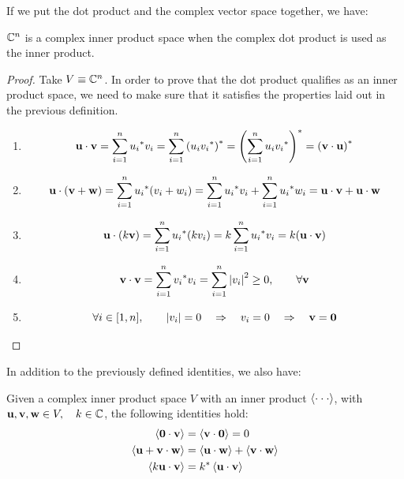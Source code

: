 \documentclass[12pt]{article}
\begin{document}
If we put the dot product and the complex vector space together, we have:

\begin{theorem}
    $\mathbb{C}^n$ is a complex inner product space when the complex dot product is used as the inner product.
\end{theorem}

\begin{proof}
    Take $V \equiv \mathbb{C}^n$. In order to prove that the dot product qualifies as an inner product space, we need to make sure that it satisfies the properties laid out in the previous definition. 
    \begin{enumerate}
        \item $$\mathbf{u} \cdot \mathbf{v} = \sum_{i=1}^{n} {u_i}^* v_i = \sum_{i=1}^{n} {(u_i {v_i}^*)}^* = {\left(\sum_{i=1}^{n} u_i {v_i}^*\right)}^* = {(\mathbf{v} \cdot \mathbf{u})}^*$$
        \item $$\mathbf{u} \cdot (\mathbf{v} + \mathbf{w}) = \sum_{i=1}^{n} {u_i}^*(v_i + w_i) = \sum_{i=1}^{n} {u_i}^* v_i + \sum_{i=1}^{n} {u_i}^* w_i = \mathbf{u} \cdot \mathbf{v} + \mathbf{u} \cdot \mathbf{w}$$
        \item $$\mathbf{u} \cdot (k \mathbf{v}) = \sum_{i=1}^{n} {u_i}^* (k v_i) = k \sum_{i=1}^{n} {u_i}^* v_i = k (\mathbf{u} \cdot \mathbf{v})$$
        \item $$\mathbf{v} \cdot \mathbf{v} = \sum_{i=1}^{n} {v_i}^* v_i = \sum_{i=1}^{n} \abs{v_i}^2 \geq 0, \qquad \forall \mathbf{v}$$
        \item $$\forall i \in [1, n], \qquad \abs{v_i} = 0 \quad \Rightarrow \quad v_i = 0 \quad \Rightarrow \quad \mathbf{v} = \mathbf{0}$$
    \end{enumerate}
\end{proof}

In addition to the previously defined identities, we also have:

\begin{theorem}
    Given a complex inner product space $V$ with an inner product $\left\langle\cdot \cdot \cdot \right\rangle$, with $\mathbf{u}, \mathbf{v}, \mathbf{w} \in V, \quad k \in \mathbb{C}$, the following identities hold:
    \begin{align*}
        \left\langle\mathbf{0} \cdot \mathbf{v} \right\rangle &= \left\langle\mathbf{v} \cdot \mathbf{0} \right\rangle = 0 \\
        \left\langle\mathbf{u} + \mathbf{v} \cdot \mathbf{w} \right\rangle &= \left\langle\mathbf{u} \cdot \mathbf{w} \right\rangle + \left\langle\mathbf{v} \cdot \mathbf{w} \right\rangle \\
        \left\langle k \mathbf{u} \cdot \mathbf{v} \right\rangle &= {k}^* \left\langle\mathbf{u} \cdot \mathbf{v} \right\rangle
    \end{align*}
\end{theorem}
\end{document}
